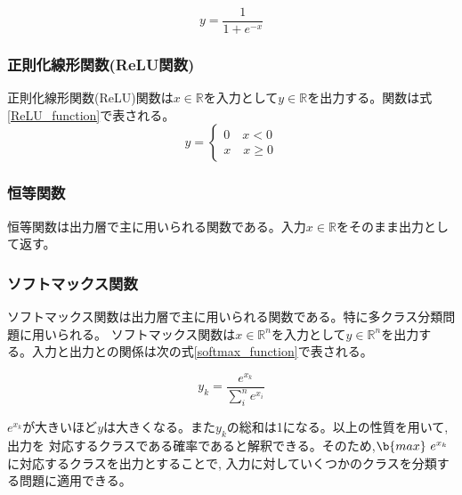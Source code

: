 \begin{equation}
  \label{sigmoid_function}
  y = \frac{1}{1+e^{-x}}
\end{equation}

\subsubsection{正則化線形関数(ReLU関数)}
正則化線形関数(ReLU)関数は$x\in \mathbb{R}$を入力として$y \in \mathbb{R}$を出力する。関数は式\ref{ReLU_function}で表される。
\begin{equation}
  \label{ReLU_function}
  y = \left\{
    \begin{aligned}
      0 \quad x < 0 \\
      x \quad x \geq 0
    \end{aligned}
  \right.
\end{equation}

\subsubsection{恒等関数}
恒等関数は出力層で主に用いられる関数である。入力$x\in \mathbb{R}$をそのまま出力として返す。

\subsubsection{ソフトマックス関数}
ソフトマックス関数は出力層で主に用いられる関数である。特に多クラス分類問題に用いられる。
ソフトマックス関数は$x\in \mathbb{R}^n$を入力として$y \in \mathbb{R}^n$を出力する。入力と出力との関係は次の式\ref{softmax_function}で表される。

\begin{equation}
\label{softmax_function}
y_k = \frac{e^{x_k}}{\sum_i^n e^{x_i}}
\end{equation}

$e^{x_k}$が大きいほど$y$は大きくなる。また$y_k$の総和は1になる。以上の性質を用いて,出力を
対応するクラスである確率であると解釈できる。そのため,$\b{max} \ e^{x_k}$に対応するクラスを出力とすることで,
入力に対していくつかのクラスを分類する問題に適用できる。

